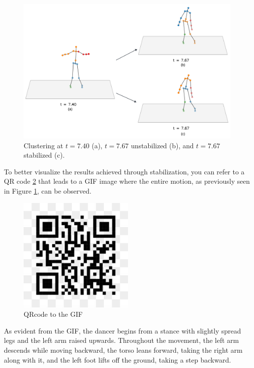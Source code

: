 \begin{figure}[H]
  \centering
  \includegraphics[width=0.99\textwidth]{graphics/ClustersStabilization.png}
  \caption{Clustering at $t=7.40$ (a), $t=7.67$ unstabilized (b), and $t=7.67$ stabilized (c).}
  \label{fig:stabilization_results}
\end{figure}

To better visualize the results achieved through stabilization, you can refer to a QR code \ref{fig:QRcode} that leads to a GIF image where the entire motion, as previously seen in Figure \ref{fig:stabilization_results}, can be observed.

\begin{figure}[H]
  \centering
  \includegraphics[width=0.50\textwidth]{graphics/qrcode.jpg}
  \caption{QRcode to the GIF}
  \label{fig:QRcode}
\end{figure}

As evident from the GIF, the dancer begins from a stance with slightly spread legs and the left arm raised upwards.
Throughout the movement, the left arm descends while moving backward, the torso leans forward, taking the right arm along with it, and the left foot lifts off the ground, taking a step backward.